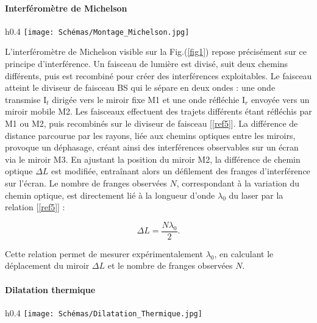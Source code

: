 \documentclass[a4paper, 12pt,oneside]{article}
\begin{document}
\paragraph{Interféromètre de Michelson}

\begin{wrapfigure}{h}{0.4\textwidth}
    \centering
    \texttt{[image: Schémas/Montage\_Michelson.jpg]}
    \captionsetup{justification=centering}
    \caption{Interféromètre de Michelson.}
    \label{fig1}
\end{wrapfigure}


L’interféromètre de Michelson visible sur la Fig.(\ref{fig1}) repose précisément sur ce principe d’interférence. Un faisceau de lumière est divisé, suit deux chemins différents, puis est recombiné pour créer des interférences exploitables. Le faisceau atteint le diviseur de faisceau BS qui le sépare en deux ondes : une onde transmise I$_t$ dirigée vers le miroir fixe M1 et une onde réfléchie I$_r$ envoyée vers un miroir mobile M2.
Les faisceaux effectuent des trajets différents étant réfléchis par M1 ou M2, puis recombinés sur le diviseur de faisceau [\ref{ref5}]. La différence de distance parcourue par les rayons, liée aux chemins optiques entre les miroirs, provoque un déphasage, créant ainsi des interférences observables sur un écran via le miroir M3. En ajustant la position du miroir M2, la différence de chemin optique $\Delta L$ est modifiée, entraînant alors un défilement des franges d’interférence sur l’écran.
Le nombre de franges observées $N$, correspondant à la variation du chemin optique, est directement lié à la longueur d’onde $\lambda_0$ du laser par la relation [\ref{ref5}] :

\begin{equation}
    \Delta L=\frac{N\lambda_0}{2}.
\label{eq1}
\end{equation}

Cette relation permet de mesurer expérimentalement $\lambda_0$, en calculant le déplacement du miroir $\Delta L$ et le nombre de franges observées $N$.

\paragraph{Dilatation thermique}

\begin{wrapfigure}{h}{0.4\textwidth}
    \centering
    \texttt{[image: Schémas/Dilatation\_Thermique.jpg]}
    \captionsetup{justification=centering}
    \caption{Interféromètre de Michelson pour l'étude de la dilatation thermique.}
    \label{fig2}
\end{wrapfigure}
\end{document}

